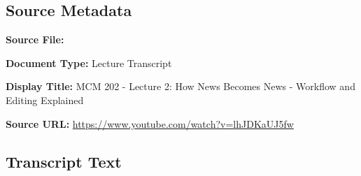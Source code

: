 \subsection*{Source Metadata}
\noindent\textbf{Source File:} \par
\noindent\textbf{Document Type:} Lecture Transcript\par
\noindent\textbf{Display Title:} MCM 202 - Lecture 2: How News Becomes News - Workflow and Editing Explained\par
\noindent\textbf{Source URL:} \url{https://www.youtube.com/watch?v=lhJDKaUJ5fw}\par

\subsection*{Transcript Text}
